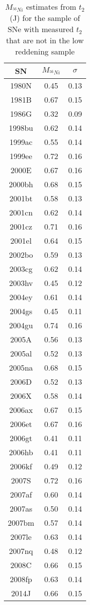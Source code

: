 \begin{table}
\begin{center}
\caption{$M_{^{56}Ni}$ estimates from $t_2$ (J) for the sample of SNe with measured $t_2$ that are not in the low reddening sample}
\begin{tabular}{ccc}
\hline
SN & $M_{^{56}Ni}$ & $\sigma$ \\
\hline
1980N & 0.45 & 0.13 \\
1981B & 0.67 & 0.15 \\
1986G & 0.32 & 0.09 \\
1998bu & 0.62 & 0.14 \\
1999ac & 0.55 & 0.14 \\
1999ee & 0.72 & 0.16 \\
2000E & 0.67 & 0.16 \\
2000bh & 0.68 & 0.15 \\
2001bt & 0.58 & 0.13 \\
2001cn & 0.62 & 0.14 \\
2001cz & 0.71 & 0.16 \\
2001el & 0.64 & 0.15 \\
2002bo & 0.59 & 0.13 \\
2003cg & 0.62 & 0.14 \\
2003hv & 0.45 & 0.12 \\
2004ey & 0.61 & 0.14 \\
2004gs & 0.45 & 0.11 \\
2004gu & 0.74 & 0.16 \\
2005A & 0.56 & 0.13 \\
2005al & 0.52 & 0.13 \\
2005na & 0.68 & 0.15 \\
2006D & 0.52 & 0.13 \\
2006X & 0.58 & 0.14 \\
2006ax & 0.67 & 0.15 \\
2006et & 0.67 & 0.16 \\
2006gt & 0.41 & 0.11 \\
2006hb & 0.41 & 0.11 \\
2006kf & 0.49 & 0.12 \\
2007S & 0.72 & 0.16 \\
2007af & 0.60 & 0.14 \\
2007as & 0.50 & 0.14 \\
2007bm & 0.57 & 0.14 \\
2007le & 0.63 & 0.14 \\
2007nq & 0.48 & 0.12 \\
2008C & 0.66 & 0.15 \\
2008fp & 0.63 & 0.14 \\
2014J & 0.66 & 0.15 \\
\hline
\end{tabular}
\label{tab:comp_ni}
\end{center}
\end{table}
